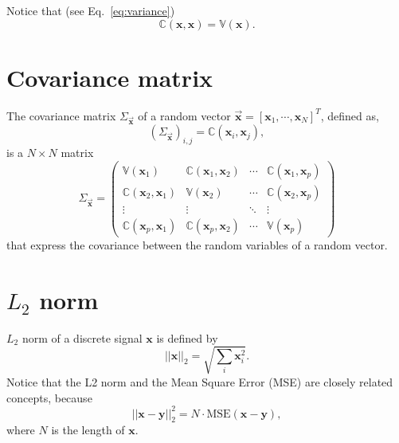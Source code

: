 Notice that (see Eq.~\ref{eq:variance})
\begin{equation}
  \mathbb{C}(\mathbf{x}, \mathbf{x}) = \mathbb{V}(\mathbf{x}).
\end{equation}


\section{Covariance matrix}
\label{sec:covariance_matrix}

The covariance matrix $\Sigma_{\overrightarrow{\mathbf{x}}}$ of a random vector $\overrightarrow{\mathbf{x}}=[\mathbf{x}_1,\cdots,\mathbf{x}_N]^T$, defined as,
\begin{equation}
  (\Sigma_{\overrightarrow{\mathbf{x}}})_{i,j}=\mathbb{C}(\mathbf{x}_i,\mathbf{x}_j),
\end{equation}
is a $N\times N$ matrix
\begin{equation}
\Sigma_{\overrightarrow{\mathbf{x}}} = 
\begin{pmatrix}
\mathbb{V}(\mathbf{x}_1) & \mathbb{C}(\mathbf{x}_1, \mathbf{x}_2) & \cdots & \mathbb{C}(\mathbf{x}_1, \mathbf{x}_p) \\
\mathbb{C}(\mathbf{x}_2, \mathbf{x}_1) & \mathbb{V}(\mathbf{x}_2) & \cdots & \mathbb{C}(\mathbf{x}_2, \mathbf{x}_p) \\
\vdots & \vdots & \ddots & \vdots \\
\mathbb{C}(\mathbf{x}_p, \mathbf{x}_1) & \mathbb{C}(\mathbf{x}_p, \mathbf{x}_2) & \cdots & \mathbb{V}(\mathbf{x}_p)
\end{pmatrix}
\end{equation}
that express the covariance between the random variables of a random vector.


\section{$L_2$ norm}
\label{sec:L2_norm}

$L_2$ norm of a discrete signal $\mathbf{x}$ is defined by
\begin{equation}
  ||\mathbf{x}||_2 = \sqrt{\sum_i\mathbf{x}_i^2}.
\end{equation}
Notice that the L2 norm and the Mean Square Error (MSE) are closely
related concepts, because
\begin{equation}
  ||\mathbf{x} - \mathbf{y}||_2^2 = N\cdot\text{MSE}(\mathbf{x} - \mathbf{y}),
\end{equation}
where $N$ is the length of $\mathbf{x}$.

